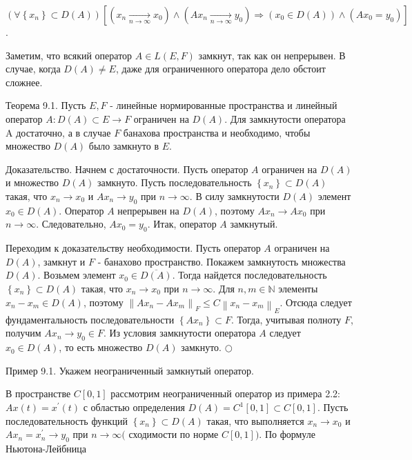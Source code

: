 $\left(\forall\left\{x_{n}\right\} \subset D(A)\right)\left[\left(x_{n} \underset{n \rightarrow \infty}{\longrightarrow} x_{0}\right) \wedge\left(A x_{n} \underset{n \rightarrow \infty}{\longrightarrow} y_{0}\right) \Rightarrow\left(x_{0} \in D(A)\right) \wedge\left(A x_{0}=y_{0}\right)\right]$.

Заметим, что всякий оператор $A \in L(E, F)$ замкнут, так как он непрерывен. В случае, когда $D(A) \neq E$, даже для ограниченного оператора дело обстоит сложнее.

Теорема 9.1. Пусть $E, F$ - линейные нормированные пространства и линейный оператор $A: D(A) \subset E \rightarrow F$ ограничен на $D(A)$. Для замкнутости оператора A достаточно, а в случае $F$ банахова пространства $и$ необходимо, чтобы множество $D(A)$ было замкнуто в $E$.

Доказательство. Начнем с достаточности. Пусть оператор $A$ ограничен на $D(A)$ и множество $D(A)$ замкнуто. Пусть последовательность $\left\{x_{n}\right\} \subset D(A)$ такая, что $x_{n} \rightarrow x_{0}$ и $A x_{n} \rightarrow y_{0}$ при $n \rightarrow \infty$. В силу замкнутости $D(A)$ элемент $x_{0} \in D(A)$. Оператор $A$ непрерывен на $D(A)$, поэтому $A x_{n} \rightarrow A x_{0}$ при $n \rightarrow \infty$. Следовательно, $A x_{0}=y_{0}$. Итак, оператор $A$ замкнутый.

Переходим к доказательству необходимости. Пусть оператор $A$ ограничен на $D(A)$, замкнут и $F$ - банахово пространство. Покажем замкнутость множества $D(A)$. Возьмем элемент $x_{0} \in \overline{D(A)}$. Тогда найдется последовательность $\left\{x_{n}\right\} \subset D(A)$ такая, что $x_{n} \rightarrow x_{0}$ при $n \rightarrow \infty$. Для $n, m \in \mathbb{N}$ элементы $x_{n}-x_{m} \in D(A)$, поэтому $\left\|A x_{n}-A x_{m}\right\|_{F} \leq C\left\|x_{n}-x_{m}\right\|_{E}$. Отсюда следует фундаментальность последовательности $\left\{A x_{n}\right\} \subset F$. Тогда, учитывая полноту $F$, получим $A x_{n} \rightarrow y_{0} \in F$. Из условия замкнутости оператора $A$ следует $x_{0} \in D(A)$, то есть множество $D(A)$ замкнуто. $\bigcirc$

Пример 9.1. Укажем неограниченный замкнутый оператор.

В пространстве $C[0,1]$ рассмотрим неограниченный оператор из примера 2.2: $A x(t)=x^{\prime}(t)$ с областью определения $D(A)=C^{1}[0,1] \subset C[0,1]$. Пусть последовательность функций $\left\{x_{n}\right\} \subset D(A)$ такая, что выполняется $x_{n} \rightarrow x_{0}$ и $A x_{n}=x_{n}^{\prime} \rightarrow y_{0}$ при $n \rightarrow \infty($ сходимости по норме $C[0,1])$. По формуле Ньютона-Лейбница

